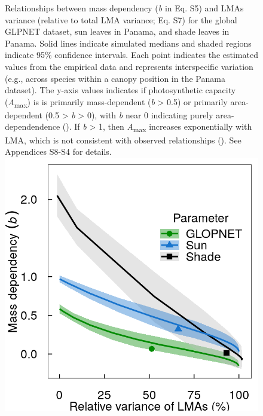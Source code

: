\documentclass[
  12pt,
  letterpaper,
  DIV=11,
  numbers=noendperiod]{scrartcl}
\providecommand{\DIFaddendFL}{} %
\DeclareRobustCommand{\DIFaddendFL}{\DIFOaddendFL \let\includegraphics\DIFOincludegraphics} %
\begin{document}
\begin{figure}
{Relationships between mass dependency (\emph{b} in Eq. S5) and LMAs
variance (relative to total LMA variance; Eq. S7) for the global GLPNET
dataset, sun leaves in Panama, and shade leaves in Panama. Solid lines
indicate simulated medians and shaded regions indicate 95\% confidence
intervals. Each point indicates the estimated values from the empirical
data and represents interspecific variation (e.g., across species within
a canopy position in the Panama dataset). The y-axis values indicates if
photosynthetic capacity (\emph{A}\textsubscript{max}) is is primarily
mass-dependent (\emph{b} \textgreater{} 0.5) or primarily area-dependent
(0.5 \textgreater{} \emph{b} \textgreater{} 0), with \emph{b} near 0
indicating purely area-dependendence (). If \emph{b} \textgreater{} 1, then
\emph{A}\textsubscript{max} increases exponentially with LMA, which is
not consistent with observed relationships
(). See Appendices S8-S4 for
details. \includegraphics{../figs/mass_prop_mv.png}

}
\DIFaddendFL 

\caption{\label{fig-mass_prop}}

\end{figure}%

\newpage
\end{document}
